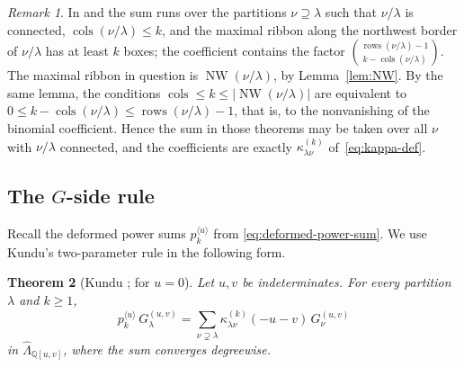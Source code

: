 \documentclass[11pt]{amsart}
\numberwithin{equation}{section}
\newtheorem{theorem}{Theorem}[section]
\theoremstyle{definition}
\theoremstyle{remark}
\newtheorem{remark}[theorem]{Remark}
\newcommand{\hLam}{\widehat\Lambda}
\newcommand{\rows}{\operatorname{rows}}
\newcommand{\cols}{\operatorname{cols}}
\newcommand{\NW}{\operatorname{NW}}
\newcommand{\QQ}{\mathbb Q}
\begin{document}
\begin{remark}\label{rem:NW-automatic}
In \cite[Thm.~1.1]{NHST} and \cite[Corollary~2]{Kundu} the sum runs over the
partitions $\nu\supseteq\lambda$ such that $\nu/\lambda$ is connected,
$\cols(\nu/\lambda)\leq k$, and the maximal ribbon along the northwest border
of $\nu/\lambda$ has at least $k$ boxes; the coefficient contains the
factor $\binom{\rows(\nu/\lambda)-1}{k-\cols(\nu/\lambda)}$. The maximal
ribbon in question is $\NW(\nu/\lambda)$, by Lemma~\ref{lem:NW}. By the
same lemma, the conditions $\cols\leq k\leq|\NW(\nu/\lambda)|$ are
equivalent to $0\leq k-\cols(\nu/\lambda)\leq\rows(\nu/\lambda)-1$, that is,
to the nonvanishing of the binomial coefficient. Hence the sum in those
theorems may be taken over all $\nu$ with $\nu/\lambda$ connected, and the
coefficients are exactly $\kappa^{(k)}_{\lambda\nu}$ of~\eqref{eq:kappa-def}.
\end{remark}

\subsection{The \texorpdfstring{$G$}{G}-side rule}
Recall the deformed power sums $p_k^{\langle u\rangle}$ from
\eqref{eq:deformed-power-sum}. We use Kundu's two-parameter rule
in the following form.

\begin{theorem}[Kundu {\cite[Corollary~2]{Kundu}}; {\cite[Thm.~1.1]{NHST}} for $u=0$]
\label{thm:Kundu}
Let $u,v$ be indeterminates. For every partition $\lambda$ and $k\geq1$,
\[
 p^{\langle u\rangle}_k\,G^{(u,v)}_\lambda
 =\sum_{\nu\supsetneq\lambda}\kappa^{(k)}_{\lambda\nu}(-u-v)\,G^{(u,v)}_\nu
\]
in $\hLam_{\QQ[u,v]}$, where the sum converges degreewise.
\end{theorem}
\end{document}
